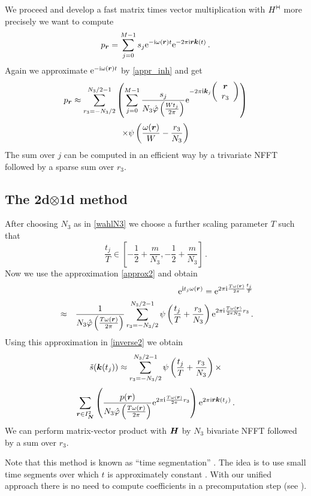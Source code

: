 \documentclass[journal]{IEEEtran}
\def\ti{\mbox{\scriptsize{\rm i}}}
\newcommand{\eip}[1]{{\rm e}^{ 2\pi{\ti} #1}}
\newcommand{\eim}[1]{{\rm e}^{-2\pi{\ti} #1}}
\newcommand{\zb}[1]{\mbox{\boldmath{${#1}$}}}
\newcommand{\zbs}[1]{\mbox{\boldmath\scriptsize{${#1}$}}}
\newcommand{\zbss}[1]{\mbox{\boldmath\tiny{${#1}$}}}
\newcommand{\adj}{{\vdash \hspace*{-1.72mm} \dashv}}
\numberwithin{equation}{section}
\numberwithin{table}{section}
\numberwithin{figure}{section}
\begin{document}
We proceed and develop a fast matrix times vector
multiplication with $H^{\adj}$ more precisely we want to compute
\[
p_{\zbs r} =
\sum_{j=0}^{M-1} s_j 
{\rm e}^{-{\rm\scriptsize i}\omega(\zbs r)t}
{\rm e}^{-2\pi {\rm\scriptsize i}\zbs r \zbs k(t)}\, .
\]
Again we approximate ${\rm e}^{-{\rm\scriptsize i}\omega(\zbs r)t}$ by
\eqref{appr_inh} and get
\[
p_{\zbs r} \approx
\sum_{r_3=-N_3/2}^{N_3/2-1}\left(
\sum_{j=0}^{M-1} \frac{s_j}{N_3 \hat\varphi\left(\frac{Wt_j}{2\pi}\right)}
 \eim{\zbs k_j
\left(\begin{array}{c}
\zb r\\
r_3
\end{array}\right)}\right)
\]
\[
\times
\psi \left(\frac{\omega(\zb r)}{W}-\frac{r_3}{N_3}\right)
\]
The sum over $j$ can be computed in an efficient way by a
trivariate NFFT followed by a sparse sum over $r_3$.

\subsection{The 2d$\otimes$1d method}

After choosing $N_3$ as in \eqref{wahlN3} we choose a further scaling parameter $T$ such that
\[
\frac{t_j}{T}
\in[-\frac{1}{2}+\frac{m}{N_3},-\frac{1}{2}+\frac{m}{N_3}]\, . 
\]
Now we use the approximation \eqref{approx2} and obtain
\begin{eqnarray*}
&&{\rm e}^{\ti t_j \omega(\zbs r)} = 
\eip{\frac{T\omega(\zbss r)}{2\pi}\frac{t_j}{T}}\\ \nonumber
&\approx&
\frac{1}{N_3\hat\varphi\left(\frac{T\omega(\zbs r)}{2\pi}\right)}
\sum_{r_3=-N_3/2}^{N_3/2-1} 
\psi\left(\frac{t_j}{T}+\frac{r_3}{N_3}\right)  
\eip{\frac{T\omega(\zbss r)}{2\pi N_3}r_3}\, .
\end{eqnarray*}
Using this approximation in \eqref{inverse2} we obtain
\begin{equation*}
\tilde s(\zb k(t_j)) \approx
\sum_{r_3=-N_3/2}^{N_3/2-1}
\psi\left(\frac{t_j}{T}+\frac{r_3}{N_3}\right) \times
\end{equation*}
\begin{equation*}
\sum_{\zbs r \in I^2_{\zbss N}} 
\left(
\frac{p(\zb r)}{N_3\hat\varphi\left(\frac{T\omega(\zbs
      r)}{2\pi}\right)}
\eip{\frac{T\omega(\zbss r)}{2\pi}r_3}
\right)
{\rm e}^{2\pi {\rm\scriptsize i}\zbs r \zbs k(t_j)}\, .
\end{equation*}
We can perform  matrix-vector product with $\zb H$ by $N_3$ bivariate
NFFT followed by a sum over $r_3$.

Note that this method is known as ``time segmentation'' \cite{SuNoFe03}. The
idea is to use  small time segments over which $t$ is approximately
constant \cite{NoMe91}. With our unified approach there is no need to
compute coefficients in a precomputation step (see \cite{SuNoFe03}). 
\end{document}
